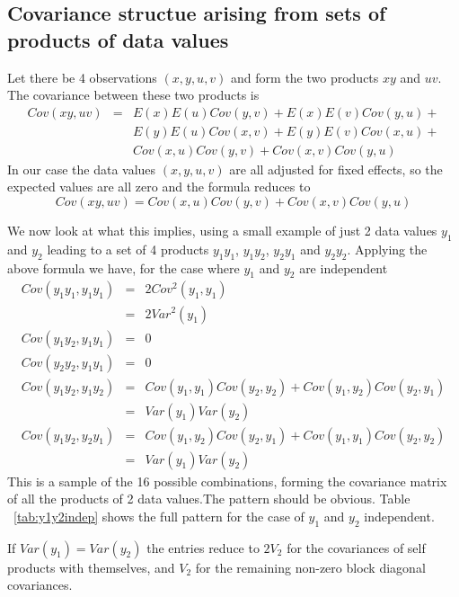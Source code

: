 \documentclass[titlepage]{article}  %
\begin{document}
\subsection{Covariance structue arising from sets of products of data values}
 Let there be 4 observations $(x,y,u,v)$ and form the two products $xy$ and $uv$. The covariance between these two products is 
\begin{eqnarray}
Cov(xy,uv) & = & E(x)E(u)Cov(y,v) + E(x)E(v)Cov(y,u) + \\
           &   &  E(y)E(u)Cov(x,v) + E(y)E(v)Cov(x,u) + \\
           &   &  Cov(x,u)Cov(y,v) + Cov(x,v)Cov(y,u)
\end{eqnarray}
In our case the data values $(x,y,u,v)$ are all adjusted for fixed effects, so the expected values are all zero and the formula reduces to 
\begin{equation}
Cov(xy,uv) = Cov(x,u)Cov(y,v) + Cov(x,v)Cov(y,u)
\end{equation}

We now look at what this implies, using a small example of just 2 data values $y_{1}$ and $y_{2}$ leading to a set of 4 products $y_{1}y_{1}$, $y_{1}y_{2}$, $y_{2}y_{1}$ and $y_{2}y_{2}$. Applying the above formula we have, for the case where $y_{1}$ and $y_{2}$ are independent
\begin{eqnarray}
Cov(y_{1}y_{1},y_{1}y_{1}) & = & 2 Cov^{2}(y_{1},y_{1}) \\
                           & = & 2 Var^{2}(y_{1}) \\
Cov(y_{1}y_{2},y_{1}y_{1}) & = & 0 \\
Cov(y_{2}y_{2},y_{1}y_{1}) & = & 0 \\
Cov(y_{1}y_{2},y_{1}y_{2}) & = & Cov(y_{1},y_{1})Cov(y_{2},y_{2}) + Cov(y_{1},y_{2})Cov(y_{2},y_{1}) \\
                           & = & Var(y_{1}) Var(y_{2}) \\
Cov(y_{1}y_{2},y_{2}y_{1}) & = & Cov(y_{1},y_{2})Cov(y_{2},y_{1}) + Cov(y_{1},y_{1})Cov(y_{2},y_{2}) \\
                           & = & Var(y_{1}) Var(y_{2})
\end{eqnarray}
 This is a sample of the 16 possible combinations, forming the covariance matrix of all the products of 2 data values.The pattern should be obvious. Table ~\ref{tab:y1y2indep} shows the full pattern for the case of $y_{1}$ and $y_{2}$ independent.

If $Var(y_{1}) = Var(y_{2})$ the entries reduce to $2 V_{2}$ for the covariances of self products with themselves, and $V_{2}$ for the remaining non-zero block diagonal covariances.
\end{document}
